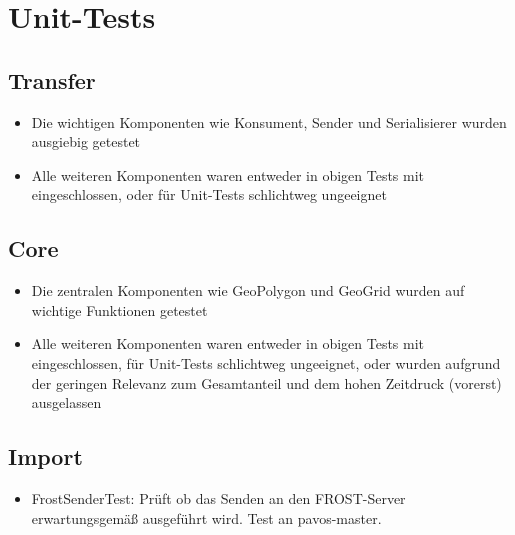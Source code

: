\chapter{Unit-Tests}
\section{Transfer}
\begin{itemize}
	\item Die wichtigen Komponenten wie Konsument, Sender und Serialisierer wurden ausgiebig getestet
	\item Alle weiteren Komponenten waren entweder in obigen Tests mit eingeschlossen, oder für Unit-Tests schlichtweg ungeeignet
\end{itemize}
\section{Core}
\begin{itemize}
	\item Die zentralen Komponenten wie GeoPolygon und GeoGrid wurden auf wichtige Funktionen getestet
	\item Alle weiteren Komponenten waren entweder in obigen Tests mit eingeschlossen, für Unit-Tests schlichtweg ungeeignet, oder wurden aufgrund der geringen Relevanz zum Gesamtanteil und dem hohen Zeitdruck (vorerst) ausgelassen
\end{itemize}
\section{Import}
\begin{itemize}
	\item FrostSenderTest: Prüft ob das Senden an den FROST-Server erwartungsgemäß ausgeführt wird. Test an pavos-master.
\end{itemize}